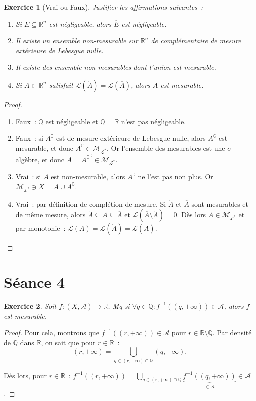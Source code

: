 \documentclass{article}
\newtheorem{ex}{Exercice}[section]
\newcommand{\pinfty}{{+\infty}}
\newcommand{\C}{\complement}
\newcommand{\Q}{{\mathbb Q}}
\newcommand{\R}{{\mathbb R}}
\begin{document}
\begin{ex}[Vrai ou Faux] Justifier les affirmations suivantes~:
\begin{enumerate}
	\item Si $E \subseteq \R^n$ est négligeable, alors $\overline E$ est négligeable.
	\item Il existe un ensemble non-mesurable sur $\R^n$ de complémentaire de mesure extérieure de Lebesgue nulle.
	\item Il existe des ensemble non-mesurables dont l'union est mesurable.
	\item Si $A \subset \R^n$ satisfait $\mathcal L(\mathring A) = \mathcal L(\overline A)$, alors $A$ est mesurable.
\end{enumerate}
\end{ex}

\begin{proof}~
\begin{enumerate}
	\item Faux~: $\Q$ est négligeable et $\overline \Q = \R$ n'est pas négligeable.
	\item Faux~: si $A^\C$ est de mesure extérieure de Lebesgue nulle, alors $A^\C$ est mesurable, et donc $A^\C \in \mathcal M_{\mathcal L^*}$. Or l'ensemble des mesurables
	est une $\sigma$-algèbre, et donc $A = {A^\C}^\C \in \mathcal M_{\mathcal L^*}$.
	\item Vrai~: si $A$ est non-mesurable, alors $A^\C$ ne l'est pas non plus. Or $\mathcal M_{\mathcal L^*} \ni X = A \cup A^\C$.
	\item Vrai~: par définition de complétion de mesure. Si $\mathring A$ et $\overline A$ sont mesurables et de même mesure, alors $\mathring A \subseteq A \subseteq \overline A$
	et $\mathcal L(\overline A \setminus \mathring A) = 0$. Dès lors $A \in \mathcal M_{\mathcal L^*}$ et par monotonie~:
	$\mathcal L(A) = \mathcal L(\mathring A) = \mathcal L(\overline A)$.
\end{enumerate}
\end{proof}

\newpage
\section{Séance 4}

\begin{ex} Soit $f : (X, \mathcal A) \to \R$. Mq si $\forall q \in \Q : f^{-1}((q, \pinfty)) \in \mathcal A$, alors $f$ est mesurable.
\end{ex}

\begin{proof} Pour cela, montrons que $f^{-1}((r, \pinfty)) \in \mathcal A$ pour $r \in \R \setminus \Q$. Par densité de $\Q$ dans $\R$, on sait que pour $r \in \R$~:
\[(r, \pinfty) = \bigcup_{q \in (r, \pinfty) \cap \Q}(q, \pinfty).\]

Dès lors, pour $r \in \R$~: $f^{-1}((r, \pinfty)) = \bigcup_{q \in (r, \pinfty) \cap \Q}\underbrace {f^{-1}((q, \pinfty))}_{\in \mathcal A} \in \mathcal A$.
\end{proof}
\end{document}
